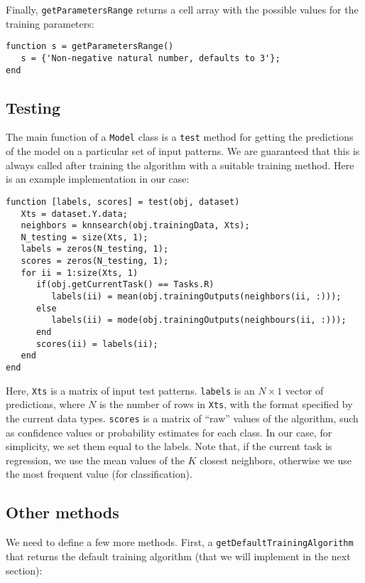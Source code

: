 \noindent Finally, \verb|getParametersRange| returns a cell array with the possible values for the training parameters:

\begin{lstlisting}
function s = getParametersRange()
   s = {'Non-negative natural number, defaults to 3'};
end
\end{lstlisting}

\subsection{Testing}

The main function of a \verb|Model| class is a \verb|test| method for getting the predictions of the model on a particular set of input patterns. We are guaranteed that this is always called after training the algorithm with a suitable training method. Here is an example implementation in our case:

\begin{lstlisting}
function [labels, scores] = test(obj, dataset)
   Xts = dataset.Y.data;
   neighbors = knnsearch(obj.trainingData, Xts);
   N_testing = size(Xts, 1);
   labels = zeros(N_testing, 1);
   scores = zeros(N_testing, 1);
   for ii = 1:size(Xts, 1)
      if(obj.getCurrentTask() == Tasks.R)
         labels(ii) = mean(obj.trainingOutputs(neighbors(ii, :)));
      else
         labels(ii) = mode(obj.trainingOutputs(neighbours(ii, :)));
      end
      scores(ii) = labels(ii);
   end
end
\end{lstlisting}

Here, \verb|Xts| is a matrix of input test patterns. \verb|labels| is an $N \times 1$ vector of predictions, where $N$ is the number of rows in \verb|Xts|, with the format specified by the current data types. \verb|scores| is a matrix of ``raw'' values of the algorithm, such as confidence values or probability estimates for each class. In our case, for simplicity, we set them equal to the labels. Note that, if the current task is regression, we use the mean values of the $K$ closest neighbors, otherwise we use the most frequent value (for classification).

\subsection{Other methods}

We need to define a few more methods. First, a \verb|getDefaultTrainingAlgorithm| that returns the default training algorithm (that we will implement in the next section):

